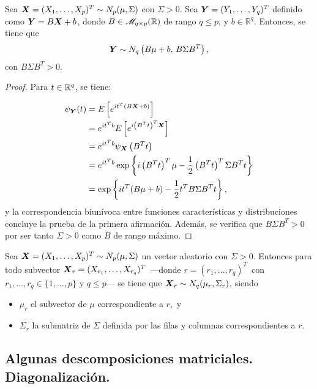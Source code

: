  
    \begin{nprop} \label{linealesrangomaximo}
      Sea $\boldsymbol{X} = (X_1,\dots,X_p)^T \sim N_p(\mu,\Sigma)$ con $\Sigma > 0$. Sea $\boldsymbol{Y} = (Y_1,\dots,Y_q)^T$ definido como $\boldsymbol{Y} = B\boldsymbol{X} + b$, donde $B\in \mathscr{M}_{q\times p}(\mathbb{R})$ de rango $q \leq p$, y $b \in \mathbb R^q$. Entonces, se tiene que
      \[
        \boldsymbol{Y} \sim N_q\left(B\mu+b,\, B\Sigma B^T\right),
      \]
      con $B\Sigma B^T > 0$.
    \end{nprop}
    \begin{proof}
      Para $t\in \mathbb{R}^q$, se tiene:

      \[
      \begin{split}
        \psi_{\boldsymbol{Y}}(t) & = E\left[ e^{it^T(B\boldsymbol{X} + b)} \right] \\
        & = e^{it^Tb} E\left[ e^{i\left(B^Tt\right)^T\boldsymbol{X}} \right] \\
        & = e^{it^Tb} \psi_{\boldsymbol{X}}\left(B^Tt\right) \\
        & = e^{it^Tb} \exp\left\{i\left(B^Tt\right)^T \mu- \frac{1}{2}\left(B^Tt\right)^T \Sigma B^Tt\right\} \\
        & = \exp\left\{it^T(B\mu + b) - \frac{1}{2}t^T B\Sigma B^Tt\right\},
      \end{split}
      \]
      y la correspondencia biunívoca entre funciones características y distribuciones concluye la prueba de la primera afirmación.
      Además, se verifica que $B\Sigma B^T > 0$ por ser tanto $\Sigma > 0$ como $B$ de rango máximo.
    \end{proof}

    \begin{ncor}[Marginalización]
      Sea $\boldsymbol{X} = (X_1,\dots,X_p)^T \sim N_p(\mu,\Sigma)$ un vector aleatorio con $\Sigma > 0$. Entonces para todo subvector $\boldsymbol{X}_r = (X_{r_1},\dots, X_{r_q})^T$ —donde $r = (r_1,\dots,r_q)^T$\, con $r_1,\dots,r_q \in \{1,\dots,p\}$ y $q \leq p$— se tiene que $\boldsymbol{X}_r \sim N_q(\mu_r, \Sigma_r)$, siendo
      \begin{itemize}
      \item $\mu_r$ el subvector de $\mu$ correspondiente a $r$,\, y
        \item $\Sigma_r$ la submatriz de $\Sigma$ definida por las filas y columnas correspondientes a $r$.
      \end{itemize}
    \end{ncor}

\subsection{Algunas descomposiciones matriciales. Diagonalización.}
    

